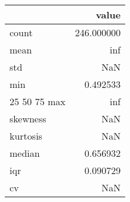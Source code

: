 \begin{tabular}{lr}
\toprule
 & value \\
\midrule
count & 246.000000 \\
mean & inf \\
std & NaN \\
min & 0.492533 \\
25%
50%
75%
max & inf \\
skewness & NaN \\
kurtosis & NaN \\
median & 0.656932 \\
iqr & 0.090729 \\
cv & NaN \\
\bottomrule
\end{tabular}
